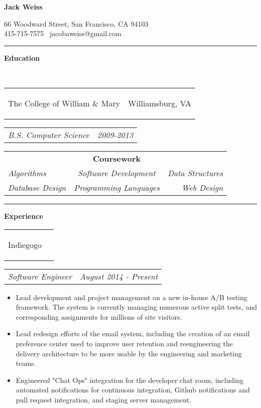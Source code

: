 \documentclass[11pt]{article}
\makeatletter
\newcommand{\headerrow}[2]
{\begin{tabular*}{\linewidth}{l@{\extracolsep{\fill}}r}
	#1 &
	#2 \\
\end{tabular*}}
\makeatother
\begin{document}
\begin{center}
	\begin{huge}
		\bf Jack Weiss
	\end{huge}

	66 Woodward Street, San Francisco, CA 94103 \\
	415-715-7575 \textbullet\ jacobaweiss@gmail.com
\end{center}
\hrule
\vspace{0.5em}

\vspace{0.8em}
\begin{LARGE}
	\bf Education
\end{LARGE}
\vspace{0.5em} \\
\headerrow
	{\begin{Large}The College of William \& Mary\end{Large}}
	{Williamsburg, VA}
\headerrow
	{\textit{B.S. Computer Science}}
	{\textit{2009-2013}}
\vspace{-1.5em}
\begin{center}
	\begin{tabular}{lcr}
		& {\bf Coursework}  & \\
		\textit{Algorithms} & \textit{Software Development} & \textit{Data Structures} \\
		\textit{Database Design} & \textit{Programming Languages} & \textit{Web Design}

	\end{tabular}
\end{center}
\hrule
\vspace{0.5em}

\vspace{0.8em}
\begin{LARGE}
	\bf Experience
\end{LARGE}
\vspace{0.5em}

	\headerrow
		{\begin{Large}Indiegogo\end{Large}}
		{}
	\headerrow
		{\textit{Software Engineer}}
		{\textit{August 2014 - Present}}
	\begin{itemize}
		\item Lead development and project management on a new in-house A/B testing framework. The system is currently managing numerous active split tests, and corresponding assignments for millions of site visitors.
		\vspace{-0.8em}
		\item Lead redesign efforts of the email system, including the creation of an email preference center used to improve user retention and reengineering the delivery architecture to be more usable by the engineering and marketing teams.
		\vspace{-0.8em}
		\item Engineered "Chat Ops" integration for the developer chat room, including automated notifications for continuous integration, Github notifications and pull request integration, and staging server management.
	\end{itemize}
\end{document}
